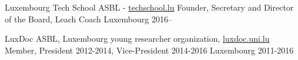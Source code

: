 

\begin{cventries}

  \cventry
    {Luxembourg Tech School ASBL - \href{techschool.lu}{techschool.lu}} 
    {Founder, Secretary and Director of the Board, Leach Coach} 
    {Luxembourg} %
    {2016--} %
    {}

  \cventry
    {LuxDoc ASBL, Luxembourg young researcher organization, \href{luxdoc.uni.lu}{luxdoc.uni.lu}} %
    {Member, President 2012-2014, Vice-President 2014-2016} %
    {Luxembourg} %
    {2011-2016} %
    {
    }


\end{cventries}
